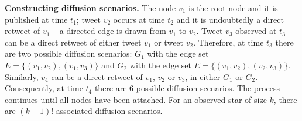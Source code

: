 \textbf{Constructing diffusion scenarios.}
The node $v_1$ is the root node and it is published at time $t_1$;
tweet $v_2$ occurs at time $t_2$ and it is undoubtedly a direct retweet of $v_1$ -- a directed edge is drawn from $v_1$ to $v_2$.
Tweet $v_3$ observed at $t_3$ can be a direct retweet of either tweet $v_1$ or tweet $v_2$.
Therefore, at time $t_3$ there are two possible diffusion scenarios:
$G_1$ with the edge set $E = \lbrace (v_1, v_2), (v_1, v_3) \rbrace$ and $G_2$ with the edge set $E = \lbrace (v_1, v_2), (v_2, v_3) \rbrace$.
Similarly, $v_4$ can be a direct retweet of $v_1$, $v_2$ or $v_3$, in either $G_1$ or $G_2$.
Consequently, at time $t_4$ there are 6 possible diffusion scenarios.
The process continues until all nodes have been attached.
For an observed star of size $k$, there are $(k-1)!$ associated diffusion scenarios.


